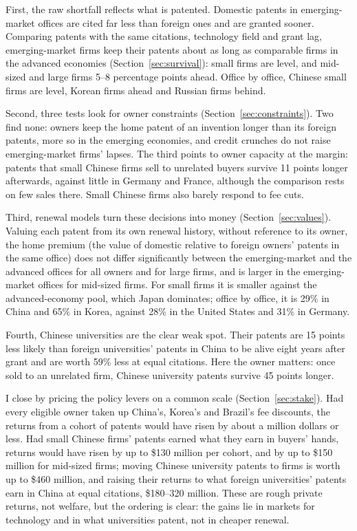 First, the raw shortfall reflects what is patented. Domestic patents in emerging-market offices are cited far less
than foreign ones and are granted sooner. Comparing patents with the same citations, technology field and grant lag,
emerging-market firms keep their patents about as long as comparable firms in the advanced economies
(Section~\ref{sec:survival}): small firms are level, and mid-sized and large firms 5--8 percentage points ahead.
Office by office, Chinese small firms are level, Korean firms ahead and Russian firms
behind.

Second, three tests look for owner constraints (Section~\ref{sec:constraints}). Two find none: owners keep the home
patent of an invention longer than its foreign patents, more so in the emerging economies, and credit crunches do not
raise emerging-market firms' lapses. The third points to owner capacity at the margin: patents that small Chinese
firms sell to unrelated buyers survive 11 points longer afterwards, against little in Germany and France, although the
comparison rests on few sales there. Small Chinese firms also barely respond to fee cuts.

Third, renewal models turn these decisions into money (Section~\ref{sec:values}). Valuing each patent from its own
renewal history, without reference to its owner, the home premium (the value of domestic relative to foreign owners'
patents in the same office) does not differ significantly between the emerging-market and the advanced offices for
all owners and for large firms, and is larger in the emerging-market offices for mid-sized firms. For small firms it
is smaller against the advanced-economy pool, which Japan dominates; office by office, it is 29\% in China and 65\%
in Korea, against 28\% in the United States and 31\% in Germany.

Fourth, Chinese universities are the clear weak spot. Their patents are 15 points less likely than foreign
universities' patents in China to be alive eight years after grant and are worth 59\% less at equal citations. Here
the owner matters: once sold to an unrelated firm, Chinese university patents survive 45 points longer.

I close by pricing the policy levers on a common scale (Section~\ref{sec:stake}). Had every eligible owner taken up
China's, Korea's and Brazil's fee discounts, the returns from a cohort of patents would have risen by about a million
dollars or less. Had small Chinese firms' patents earned what they earn in buyers' hands, returns would have risen by up to \$130 million per cohort, and by up to \$150 million for mid-sized firms; moving Chinese university patents to firms is worth
up to \$460 million, and raising their returns to what foreign universities' patents earn in China at equal
citations, \$180--320 million. These are
rough private returns, not welfare, but the ordering is clear: the gains lie in markets for technology and in what
universities patent, not in cheaper renewal.

